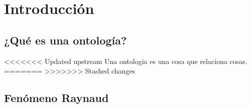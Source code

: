 \section{Introducción}

\subsection{¿Qué es una ontología?}
<<<<<<< Updated upstream
Una ontologia es una cosa que relaciona cosas.
=======
>>>>>>> Stashed changes
\subsection{Fenómeno Raynaud}